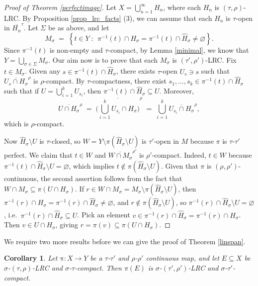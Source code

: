 \documentclass[12pt,reqno]{amsart}
\newcommand{\cl}[1]{\ensuremath{\overline{{#1}}}}
\newcommand{\map}[3]{\ensuremath{{#1}:{#2}\to{#3}}}
\newcommand{\mpi}{\ensuremath{\mathrm{\pi}}}
\newcommand{\oneton}[2]{\ensuremath{{#1}_1,\ldots,{#1}_{#2}}}
\newcommand{\set}[2]{\ensuremath{\left\{{#1}\;:\;\,{#2}\right\}}}
\newtheorem{cor}[thm]{Corollary}
\theoremstyle{definition}
\begin{document}
\begin{proof}[Proof of Theorem \ref{perfectimage}]
Let $X=\bigcup_{n=1}^\infty H_n$, where each $H_n$ is $(\tau,\rho)$-LRC. By Proposition \ref{prop_lrc_facts} (3), we can assume that each $H_n$ is $\tau$-open in $\cl{H_n}^\tau$. Let $\Sigma$ be as above, and let
\[
M_\sigma \;=\; \set{t \in Y}{\pi^{-1}(t) \cap H_\sigma = \pi^{-1}(t) \cap \hat{H}_\sigma \neq \varnothing}.
\]
Since $\pi^{-1}(t)$ is non-empty and $\tau$-compact, by Lemma \ref{minimal}, we know that $Y = \bigcup_{\sigma\in\Sigma} M_\sigma$.
Our aim now is to prove that each $M_\sigma$ is $(\tau',\rho')$-LRC. Fix $t \in M_\sigma$. Given any $s \in \pi^{-1}(t) \cap \hat{H}_\sigma$, there exists $\tau$-open $U_s \ni s$ such that $\cl{U_s \cap H_\sigma}^\rho$ is $\rho$-compact. By $\tau$-compactness, there exist $\oneton{s}{k} \in \pi^{-1}(t) \cap \hat{H}_\sigma$ such that if $U = \bigcup_{i=1}^k U_{s_i}$, then $\pi^{-1}(t) \cap \hat{H}_\sigma \subseteq U$. Moreover,
\[
\cl{U \cap H_\sigma}^\rho \;=\; \cl{\bigg(\bigcup_{i=1}^k U_{s_i} \cap H_\sigma\bigg)}^\rho
\;=\; \bigcup_{i=1}^k \cl{U_{s_i} \cap H_\sigma}^\rho,
\]
which is $\rho$-compact.

Now $\hat{H}_\sigma\setminus U$ is $\tau$-closed, so $W=Y\setminus \pi(\hat{H}_\sigma\setminus U)$ is $\tau'$-open in $M$ because $\pi$ is $\tau$-$\tau'$ perfect. We claim that $t \in W$ and $\cl{W \cap M_\sigma}^{\rho'}$ is $\rho'$-compact. Indeed, $t \in W$ because $\pi^{-1}(t) \cap \hat{H}_\sigma\setminus U = \varnothing$, which implies $t \notin \pi(\hat{H}_\sigma\setminus U)$. Given that $\pi$ is $(\rho,\rho')$-continuous, the second assertion follows from the fact that $W \cap M_\sigma \subseteq \pi(U \cap H_\sigma)$. If $r \in W \cap M_\sigma
=M_\sigma\setminus\pi(\hat{H}_\sigma\setminus U)$, then $\pi^{-1}(r) \cap H_\sigma = \pi^{-1}(r) \cap \hat{H}_\sigma \neq \varnothing$, and $r \notin \pi(\hat{H}_\sigma\setminus U)$, so $\pi^{-1}(r)\cap \hat{H}_\sigma\setminus U = \varnothing$, i.e.\ $\pi^{-1}(r)\cap \hat{H}_\sigma \subseteq U$. Pick an element $v \in \pi^{-1}(r)\cap \hat{H}_\sigma = \pi^{-1}(r) \cap H_\sigma$. Then $v \in U \cap H_\sigma$, giving $r=\pi(v) \subseteq \pi(U \cap H_\sigma)$.
\end{proof}

We require two more results before we can give the proof of Theorem \ref{linspan}.

\begin{cor}\label{ksigma-image}
Let $\map{\mpi}{X}{Y}$ be a $\tau$-$\tau'$ and $\rho$-$\rho'$ continuous map, and let $E \subseteq X$ be $\sigma$-$(\tau,\rho)$-LRC and $\sigma$-$\tau$-compact. Then $\pi(E)$ is $\sigma$-$(\tau',\rho')$-LRC and $\sigma$-$\tau'$-compact.
\end{cor}
\end{document}
